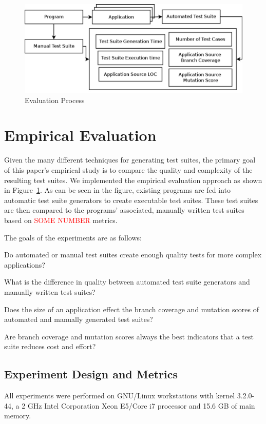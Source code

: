 
\begin{figure}[!t]
\centering
\captionsetup{justification=centering}
  \includegraphics[width=\linewidth]{proccess_diagram.pdf}
    \caption{Evaluation Process}
  \label{fig:process_diagram}
\end{figure}

\section{Empirical Evaluation}
\label{sec:evaluation}
Given the many different techniques for generating test suites, the primary goal of this paper's empirical study is to compare the quality and complexity of the resulting test suites.  We implemented the empirical evaluation approach as shown in Figure~\ref{fig:process_diagram}.  As can be seen in the figure, existing programs are fed into automatic test suite generators to create executable test suites.  These test suites are then compared to the programs' associated, manually written test suites based on \textcolor{red}{SOME NUMBER} metrics.   

The goals of the experiments are as follows:
\squishlist
\item Do automated or manual test suites create enough quality tests for more complex applications?
\item What is the difference in quality between automated test suite generators and manually written test suites?
\item Does the size of an application  effect the branch coverage and mutation scores of automated and manually generated test suites?
\item Are branch coverage and mutation scores always the best indicators that a test suite reduces cost and effort?
\squishend


\subsection{Experiment Design and Metrics}
All experiments were performed on GNU/Linux workstations with kernel 3.2.0-44, a 2 GHz Intel Corporation Xeon E5/Core i7 processor and  15.6 GB of main memory. 

